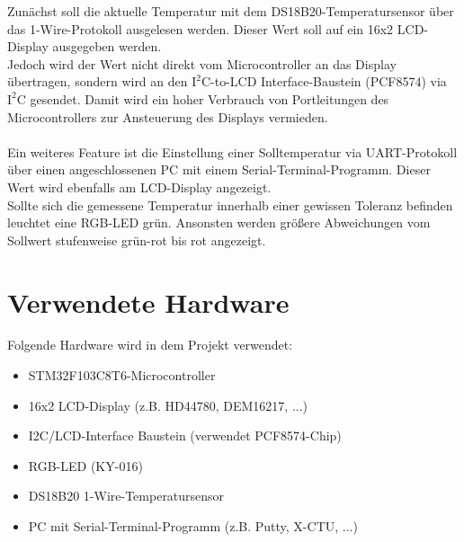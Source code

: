 \documentclass[12pt,a4paper]{article}
\begin{document}
Zunächst soll die aktuelle Temperatur mit dem DS18B20-Temperatursensor über das 1-Wire-Protokoll ausgelesen werden. Dieser Wert soll auf ein 16x2 LCD-Display ausgegeben werden. \\
Jedoch wird der Wert nicht direkt vom Microcontroller an das Display übertragen, sondern wird an den $\mathrm{I^{2}C}$-to-LCD Interface-Baustein (PCF8574) via $\mathrm{I^{2}C}$ gesendet. Damit wird ein hoher Verbrauch von Portleitungen des Microcontrollers zur Ansteuerung des Displays vermieden. \\
\\ Ein weiteres Feature ist die Einstellung einer Solltemperatur via UART-Protokoll über einen angeschlossenen PC mit einem Serial-Terminal-Programm. Dieser Wert wird ebenfalls am LCD-Display angezeigt. \\
Sollte sich die gemessene Temperatur innerhalb einer gewissen Toleranz befinden leuchtet eine RGB-LED grün. Ansonsten werden größere Abweichungen vom Sollwert stufenweise grün-rot bis rot angezeigt.
\pagebreak

\section{Verwendete Hardware}
Folgende Hardware wird in dem Projekt verwendet:
\begin{itemize}
	\item STM32F103C8T6-Microcontroller
	\item 16x2 LCD-Display (z.B. HD44780, DEM16217, ...)
	\item I2C/LCD-Interface Baustein (verwendet PCF8574-Chip)
	\item RGB-LED (KY-016)
	\item DS18B20 1-Wire-Temperatursensor
	\item PC mit Serial-Terminal-Programm (z.B. Putty, X-CTU, ...)
\end{itemize}
\end{document}
